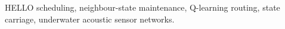 \begin{IEEEkeywords}
HELLO scheduling, neighbour-state maintenance, Q-learning routing, state carriage, underwater acoustic sensor networks.
\end{IEEEkeywords}
